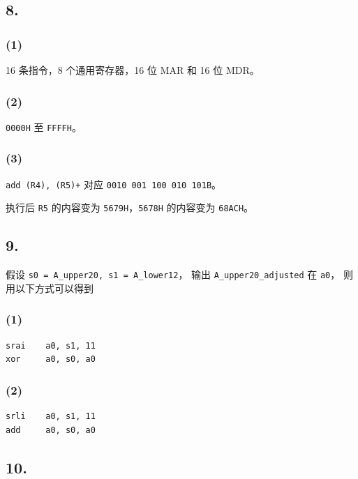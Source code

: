 \documentclass[12pt, a4paper]{ctexart}
\begin{document}
\subsection*{8.}

\subsubsection*{(1)}

16 条指令，8 个通用寄存器，16 位 MAR 和 16 位 MDR。

\subsubsection*{(2)}

\texttt{0000H} 至 \texttt{FFFFH}。

\subsubsection*{(3)}

\texttt{add (R4), (R5)+} 对应 \texttt{0010 001 100 010 101B}。

执行后 \texttt{R5} 的内容变为 \texttt{5679H}，\texttt{5678H} 的内容变为 \texttt{68ACH}。

\subsection*{9.}

假设 \texttt{s0 = A\_upper20, s1 = A\_lower12}，
输出 \texttt{A\_upper20\_adjusted} 在 \texttt{a0}，
则用以下方式可以得到

\subsubsection*{(1)}

\begin{lstlisting}[language={[RISC-V]Assembler}]
srai    a0, s1, 11
xor     a0, s0, a0
\end{lstlisting}

\subsubsection*{(2)}

\begin{lstlisting}[language={[RISC-V]Assembler}]
srli    a0, s1, 11
add     a0, s0, a0
\end{lstlisting}

\subsection*{10.}
\end{document}
